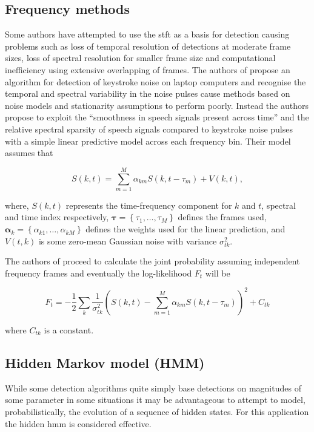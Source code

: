 \subsection{Frequency methods}
 Some authors have attempted to use the \gls{stft} as a basis for detection \cite{Czyzewski1995}\cite{Subramanya2007}\cite{Sugiyama2007}\cite{Abramson2007} causing problems such as loss of temporal resolution of detections at moderate frame sizes, loss of spectral resolution for smaller frame size and computational inefficiency using extensive overlapping of frames. The authors of \cite{Subramanya2007} propose an algorithm for detection of keystroke noise on laptop computers and recognise the temporal and spectral variability in the noise pulses cause methods based on noise models and stationarity assumptions to perform poorly. Instead the authors propose to exploit the ``smoothness in speech signals present across time'' and the relative spectral sparsity of speech signals compared to keystroke noise pulses with a simple linear predictive model across each frequency bin. Their model assumes that

\begin{equation}
\label{eq:Subramanya2007}
S(k,t) = \sum_{m=1}^M \alpha_{km} S(k,t - \tau_m) + V(k,t),
\end{equation}

where, $S(k,t)$ represents the time-frequency component for $k$ and $t$, spectral and time index respectively, $\boldsymbol{\tau} = \left\{\tau_1, \ldots ,\tau_M \right\}$ defines the frames used, \linebreak[2]$\boldsymbol{\alpha}_k = \left\{\alpha_{k1},\ldots,\alpha_{kM} \right\}$ defines the weights used for the linear prediction, and $V(t,k)$ is some zero-mean Gaussian noise with variance $\sigma^2_{tk}$.

The authors of \cite{Subramanya2007} proceed to calculate the joint probability assuming independent frequency frames and eventually the log-likelihood $F_t$ will be

\begin{equation}
\label{eq:Subramanya2007_2}
F_t = - \frac{1}{2} \sum_k \frac{1}{\sigma^2_{tk}} \left( S\left(k,t\right) - \sum_{m=1}^M \alpha_{km} S(k,t-\tau_m)\right)^2 + C_{tk}
\end{equation}

where $C_{tk}$ is a constant.

\subsection{Hidden Markov model (HMM)}
While some detection algorithms quite simply base detections on magnitudes of some parameter\cite{Subramanya2007}\cite{Sugiyama2007} in some situations it may be advantageous to attempt to model, probabilistically, the evolution of a sequence of hidden states. For this application the hidden \gls{hmm} is considered effective\cite{Rabiner1989}\cite{Xu2005}.


